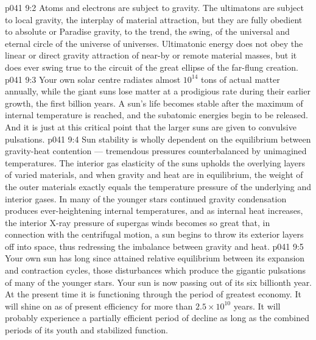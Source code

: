 \vs p041 9:2 \pc Atoms and electrons are subject to gravity. The ultimatons are  subject to local gravity, the interplay of material attraction, but they are fully obedient to absolute or Paradise gravity, to the trend, the swing, of the universal and eternal circle of the universe of universes. Ultimatonic energy does not obey the linear or direct gravity attraction of near-by or remote material masses, but it does ever swing true to the circuit of the great ellipse of the far\hyp{}flung creation.
\vs p041 9:3 \pc Your own solar centre radiates almost $10^{14}$ tons of actual matter annually, while the giant suns lose matter at a prodigious rate during their earlier growth, the first billion years. A sun’s life becomes stable after the maximum of internal temperature is reached, and the subatomic energies begin to be released. And it is just at this critical point that the larger suns are given to convulsive pulsations.
\vs p041 9:4 Sun stability is wholly dependent on the equilibrium between gravity\hyp{}heat contention --- tremendous pressures counterbalanced by unimagined temperatures. The interior gas elasticity of the suns upholds the overlying layers of varied materials, and when gravity and heat are in equilibrium, the weight of the outer materials exactly equals the temperature pressure of the underlying and interior gases. In many of the younger stars continued gravity condensation produces ever\hyp{}heightening internal temperatures, and as internal heat increases, the interior X\hyp{}ray pressure of supergas winds becomes so great that, in connection with the centrifugal motion, a sun begins to throw its exterior layers off into space, thus redressing the imbalance between gravity and heat.
\vs p041 9:5 Your own sun has long since attained relative equilibrium between its expansion and contraction cycles, those disturbances which produce the gigantic pulsations of many of the younger stars. Your sun is now passing out of its six billionth year. At the present time it is functioning through the period of greatest economy. It will shine on as of present efficiency for more than $2.5 \times 10^{10}$ years. It will probably experience a partially efficient period of decline as long as the combined periods of its youth and stabilized function.
